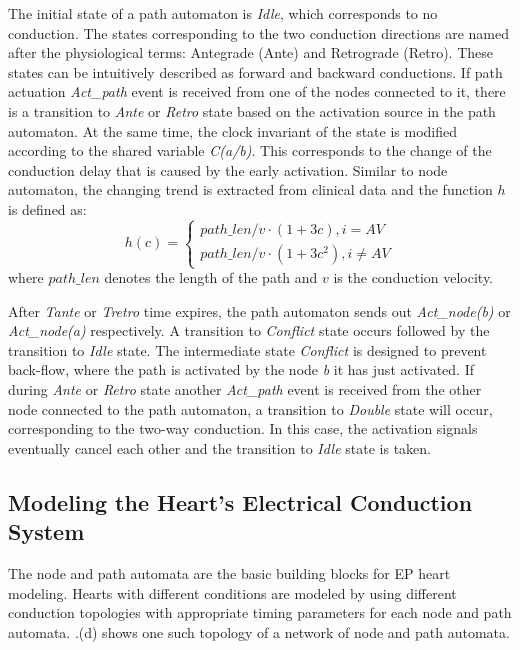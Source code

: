 The initial state of a path automaton is \emph{Idle}, which corresponds to no conduction. The states corresponding to the two conduction directions are named after the physiological terms: Antegrade (Ante) and Retrograde (Retro). These states can be intuitively described as forward and backward conductions. If path actuation \emph{Act\_path} event is received from one of the nodes connected to it, there is a transition to \emph{Ante} or \emph{Retro} state based on the activation source in the path automaton. At the same time, the clock invariant of the state is modified according to the shared variable \emph{C(a/b)}. This corresponds to the change of the conduction delay that is caused by the early activation. Similar to node automaton, the changing trend is extracted from clinical data and the function $h$ is defined as:
\begin{equation} 
						h(c) = \left\{
						\begin{array}{lr}
						
						path\_len/v\cdot (1+3c), i=AV\\
						path\_len/v\cdot (1+3c^2), i\neq AV
						\end{array}
						\right.
						\end{equation}
where $path\_len$ denotes the length of the path and $v$ is the conduction velocity.

After \emph{Tante} or \emph{Tretro} time expires, the path automaton sends out \emph{Act\_node(b)} or \emph{Act\_node(a)} respectively. A transition to \emph{Conflict} state occurs followed by the transition to \emph{Idle} state. The intermediate state \emph{Conflict} is designed to prevent back-flow, where the path is activated by the node \emph{b} it has just activated. If during \emph{Ante} or \emph{Retro} state another \emph{Act\_path} event is received from the other node connected to the path automaton, a transition to \emph{Double} state will occur, corresponding to the two-way conduction. In this case, the activation signals eventually cancel each other and the transition to \emph{Idle} state is taken.

\subsection{Modeling the Heart's Electrical Conduction System}
The node and path automata are the basic building blocks for EP heart modeling. Hearts with different conditions are modeled by using different conduction topologies with appropriate timing parameters for each node and path automata. .(d) shows one such topology of a network of node and path automata.

